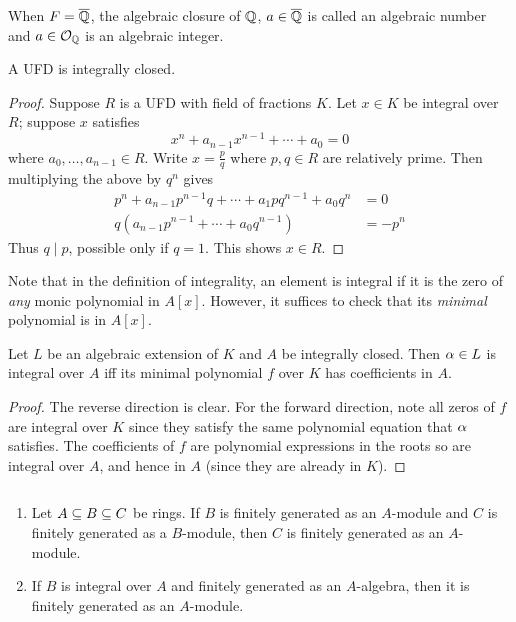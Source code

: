 When $F=\overline{\mathbb{Q}}$, the algebraic closure of $\mathbb{Q}$, $a\in \overline{\mathbb{Q}}$ is called an algebraic number and $a\in \mathcal{O}_{\mathbb{Q}}$ is an algebraic integer.
\begin{thm}
A UFD is integrally closed.
\end{thm}
\begin{proof}
Suppose $R$ is a UFD with field of fractions $K$. Let $x\in K$ be integral over $R$; suppose $x$ satisfies
\[
x^n+a_{n-1}x^{n-1}+\cdots +a_0=0
\]
where $a_0,\ldots, a_{n-1}\in R$. Write $x=\frac pq$ where $p,q\in R$ are relatively prime. Then multiplying the above by $q^n$ gives
\begin{align*}
p^n+a_{n-1}p^{n-1}q+\cdots +a_1pq^{n-1} +a_0q^n&=0\\
q(a_{n-1}p^{n-1}+\cdots +a_0q^{n-1})&=-p^n
\end{align*}
Thus $q\mid p$, possible only if $q=1$. This shows $x\in R$.
\end{proof}
Note that in the definition of integrality, an element is integral if it is the zero of {\it any} monic polynomial in $A[x]$. However, it suffices to check that its {\it minimal} polynomial is in $A[x]$.
\begin{pr}
Let $L$ be an algebraic extension of $K$ and $A$ be integrally closed. Then $\alpha\in L$ is integral over $A$ iff its minimal polynomial $f$ over $K$ has coefficients in $A$.
\end{pr}
\begin{proof}
The reverse direction is clear. For the forward direction, note all zeros of $f$ are integral over $K$ since they satisfy the same polynomial equation that $\alpha$ satisfies. The coefficients of $f$ are polynomial expressions in the roots so are integral over $A$, and hence in $A$ (since they are already in $K$).
\end{proof}
\begin{pr}$\,$
\vspace{0cm}
\begin{enumerate}
\item Let $A\subseteq B\subseteq C$ be rings. If $B$ is finitely generated as an $A$-module and $C$ is finitely generated as a $B$-module, then $C$ is finitely generated as an $A$-module.
\item If $B$ is integral over $A$ and finitely generated as an $A$-algebra, then it is finitely generated as an $A$-module.\qedhere
\end{enumerate}
\end{pr}
